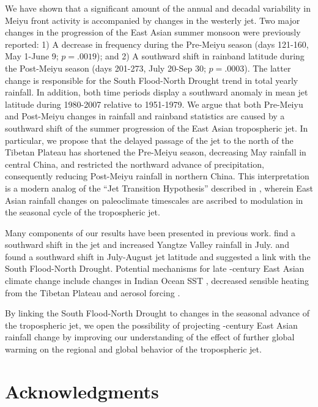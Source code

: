 	We have shown that a significant amount of the annual and decadal variability in Meiyu front activity is accompanied by changes in the westerly jet. Two major changes in the progression of the East Asian summer monsoon were previously reported: 1) A decrease in frequency during the Pre-Meiyu season (days 121-160, May 1-June 9; $p=.0019$); and 2) A southward shift in rainband latitude during the Post-Meiyu season (days 201-273, July 20-Sep 30; $p=.0003$). The latter change is responsible for the South Flood-North Drought trend in total yearly rainfall. In addition, both time periods display a southward anomaly in mean jet latitude during 1980-2007 relative to 1951-1979. We argue that both Pre-Meiyu and Post-Meiyu changes in rainfall and rainband statistics are caused by a southward shift of the summer progression of the East Asian tropospheric jet. In particular, we propose that the delayed passage of the jet to the north of the Tibetan Plateau has shortened the Pre-Meiyu season, decreasing May rainfall in central China, and restricted the northward advance of precipitation, consequently reducing Post-Meiyu rainfall in northern China. This interpretation is a modern analog of the ``Jet Transition Hypothesis'' described in \citet{Chiang2015}, wherein East Asian rainfall changes on paleoclimate timescales are ascribed to modulation in the seasonal cycle of the tropospheric jet. 	
 
	Many components of our results have been presented in previous work. \citet{Xuan2011} find a southward shift in the jet and increased Yangtze Valley rainfall in July. \citet{Yu2004} and \citet{Yu2007} found a southward shift in July-August jet latitude and suggested a link with the South Flood-North Drought. Potential mechanisms for late -century East Asian climate change include changes in Indian Ocean SST \citep{Qu2012}, decreased sensible heating from the Tibetan Plateau \citep{Liu2012a,Hu2015} and aerosol forcing \citep{Song2014}.
	
 By linking the South Flood-North Drought to changes in the seasonal advance of the tropospheric jet, we open the possibility of projecting -century East Asian rainfall change by improving our understanding of the effect of further global warming on the regional and global behavior of the tropospheric jet.
	
	
\section{Acknowledgments}

